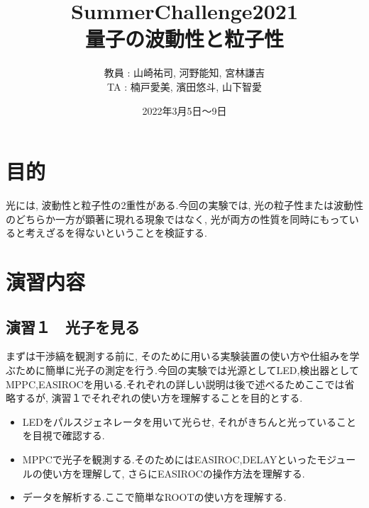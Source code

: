 \documentclass[uplatex,10pt,a4j]{jsarticle}
\begin{document}
\begin{titlepage}
  \title{SummerChallenge2021 \\ \Huge 量子の波動性と粒子性}

  \author{教員 : 山崎祐司, 河野能知, 宮林謙吉 \\TA : 楠戸愛美, 濱田悠斗, 山下智愛}
  \date{2022年3月5日〜9日}
  \maketitle
\end{titlepage}

\tableofcontents
\clearpage

\section{目的}
光には, 波動性と粒子性の2重性がある.今回の実験では, 光の粒子性または波動性のどちらか一方が顕著に現れる現象ではなく, 光が両方の性質を同時にもっていると考えざるを得ないということを検証する.

\section{演習内容}

\subsection{演習１　光子を見る}
まずは干渉縞を観測する前に, そのために用いる実験装置の使い方や仕組みを学ぶために簡単に光子の測定を行う.今回の実験では光源としてLED,検出器としてMPPC,EASIROCを用いる.それぞれの詳しい説明は後で述べるためここでは省略するが, 演習１でそれぞれの使い方を理解することを目的とする.
\begin{itemize}
  \item LEDをパルスジェネレータを用いて光らせ, それがきちんと光っていることを目視で確認する.
  \item MPPCで光子を観測する.そのためにはEASIROC,DELAYといったモジュールの使い方を理解して, さらにEASIROCの操作方法を理解する.
  \item データを解析する.ここで簡単なROOTの使い方を理解する.
\end{itemize}
\end{document}
